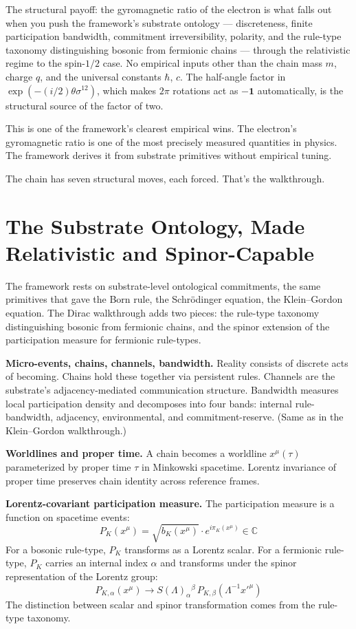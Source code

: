 \documentclass[11pt,a4paper]{article}
\begin{document}
The structural payoff: the gyromagnetic ratio of the electron is what falls out when you push the framework's substrate ontology --- discreteness, finite participation bandwidth, commitment irreversibility, polarity, and the rule-type taxonomy distinguishing bosonic from fermionic chains --- through the relativistic regime to the spin-$1/2$ case. No empirical inputs other than the chain mass $m$, charge $q$, and the universal constants $\hbar$, $c$. The half-angle factor in $\exp(-(i/2)\theta\sigma^{12})$, which makes $2\pi$ rotations act as $-\mathbf{1}$ automatically, is the structural source of the factor of two.

This is one of the framework's clearest empirical wins. The electron's gyromagnetic ratio is one of the most precisely measured quantities in physics. The framework derives it from substrate primitives without empirical tuning.

The chain has seven structural moves, each forced. That's the walkthrough.

\section{The Substrate Ontology, Made Relativistic and Spinor-Capable}

The framework rests on substrate-level ontological commitments, the same primitives that gave the Born rule, the Schr\"odinger equation, the Klein--Gordon equation. The Dirac walkthrough adds two pieces: the rule-type taxonomy distinguishing bosonic from fermionic chains, and the spinor extension of the participation measure for fermionic rule-types.

\textbf{Micro-events, chains, channels, bandwidth.} Reality consists of discrete acts of becoming. Chains hold these together via persistent rules. Channels are the substrate's adjacency-mediated communication structure. Bandwidth measures local participation density and decomposes into four bands: internal rule-bandwidth, adjacency, environmental, and commitment-reserve. (Same as in the Klein--Gordon walkthrough.)

\textbf{Worldlines and proper time.} A chain becomes a worldline $x^\mu(\tau)$ parameterized by proper time $\tau$ in Minkowski spacetime. Lorentz invariance of proper time preserves chain identity across reference frames.

\textbf{Lorentz-covariant participation measure.} The participation measure is a function on spacetime events:
\[
P_K(x^\mu) = \sqrt{b_K(x^\mu)} \cdot e^{i\pi_K(x^\mu)} \in \mathbb{C}
\]
For a bosonic rule-type, $P_K$ transforms as a Lorentz scalar. For a fermionic rule-type, $P_K$ carries an internal index $\alpha$ and transforms under the spinor representation of the Lorentz group:
\[
P_{K,\alpha}(x^\mu) \to S(\Lambda)_\alpha{}^\beta\, P_{K,\beta}(\Lambda^{-1} x'^\mu)
\]
The distinction between scalar and spinor transformation comes from the rule-type taxonomy.
\end{document}
